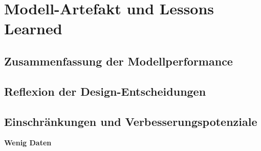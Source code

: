 \chapter{Modell-Artefakt und Lessons Learned}
\section{Zusammenfassung der Modellperformance}
\section{Reflexion der Design-Entscheidungen}
\section{Einschränkungen und Verbesserungspotenziale}

\textbf{Wenig Daten} 